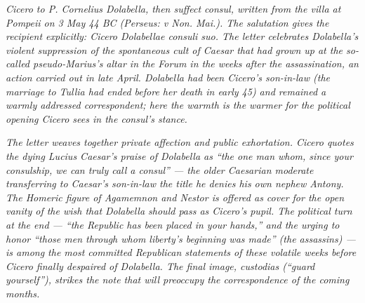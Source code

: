 
\textit{Cicero to P. Cornelius Dolabella, then suffect consul,
written from the villa at Pompeii on 3 May 44 BC (Perseus:
\textit{v Non. Mai.}). The salutation gives the recipient explicitly:
\textit{Cicero Dolabellae consuli suo}. The letter celebrates
Dolabella's violent suppression of the spontaneous cult of Caesar
that had grown up at the so-called pseudo-Marius's altar in the
Forum in the weeks after the assassination, an action carried out
in late April. Dolabella had been Cicero's son-in-law (the marriage
to Tullia had ended before her death in early 45) and remained a
warmly addressed correspondent; here the warmth is the warmer for
the political opening Cicero sees in the consul's stance.}

\textit{The letter weaves together private affection and public
exhortation. Cicero quotes the dying Lucius Caesar's praise of
Dolabella as ``the one man whom, since your consulship, we can
truly call a consul'' --- the older Caesarian moderate transferring
to Caesar's son-in-law the title he denies his own nephew Antony.
The Homeric figure of Agamemnon and Nestor is offered as cover for
the open vanity of the wish that Dolabella should pass as Cicero's
pupil. The political turn at the end --- ``the Republic has been
placed in your hands,'' and the urging to honor ``those men through
whom liberty's beginning was made'' (the assassins) --- is among
the most committed Republican statements of these volatile weeks
before Cicero finally despaired of Dolabella. The final image,
\textit{custodias} (``guard yourself''), strikes the note that
will preoccupy the correspondence of the coming months.}
